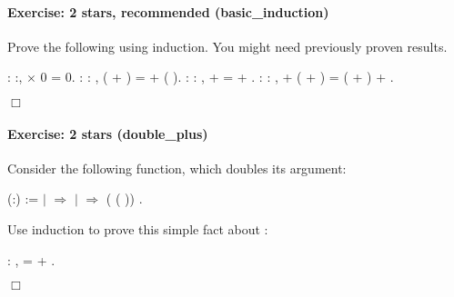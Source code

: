 \documentclass[12pt]{report}
\begin{document}
\paragraph{Exercise: 2 stars, recommended (basic\_induction)}

 Prove the following using induction. You might need previously
    proven results. \begin{coqdoccode}
\coqdocemptyline
\coqdocnoindent
{}  : \coqdockw{\ensuremath{\forall}} :,\coqdoceol
\coqdocindent{1.00em}
 \ensuremath{\times} 0 = 0.\coqdoceol
 \coqdocemptyline
\coqdocnoindent
{}  : \coqdockw{\ensuremath{\forall}}   : ,\coqdoceol
\coqdocindent{1.00em}
 ( + ) =  + ( ).\coqdoceol
 \coqdocemptyline
\coqdocnoindent
{}  : \coqdockw{\ensuremath{\forall}}   : ,\coqdoceol
\coqdocindent{1.00em}
 +  =  + .\coqdoceol
 \coqdocemptyline
\coqdocnoindent
{}  : \coqdockw{\ensuremath{\forall}}    : ,\coqdoceol
\coqdocindent{1.00em}
 + ( + ) = ( + ) + .\coqdoceol
 \end{coqdoccode}
\ensuremath{\Box} 

\paragraph{Exercise: 2 stars (double\_plus)}

 Consider the following function, which doubles its argument: \begin{coqdoccode}
\coqdocemptyline
\coqdocnoindent
{}  (:) :=\coqdoceol
\coqdocindent{1.00em}
  \coqdoceol
\coqdocindent{1.00em}
\ensuremath{|}  \ensuremath{\Rightarrow} \coqdoceol
\coqdocindent{1.00em}
\ensuremath{|}   \ensuremath{\Rightarrow}  ( ( ))\coqdoceol
\coqdocindent{1.00em}
.\coqdoceol
\coqdocemptyline
\end{coqdoccode}
Use induction to prove this simple fact about : \begin{coqdoccode}
\coqdocemptyline
\coqdocnoindent
{}  : \coqdockw{\ensuremath{\forall}} ,   =  +  .\coqdoceol
 \end{coqdoccode}
\ensuremath{\Box} 
\end{document}

